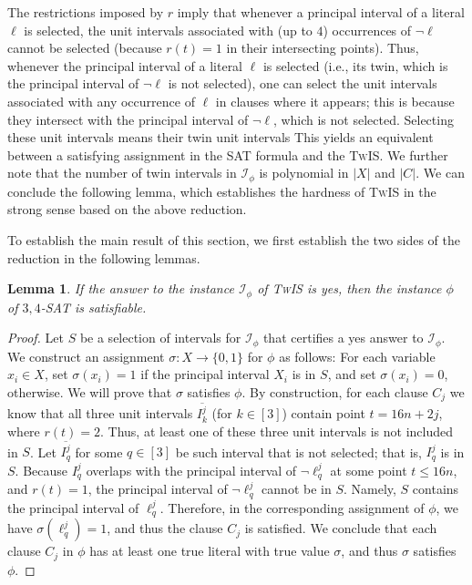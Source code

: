 \documentclass[letterpaper,11pt]{article}
\newtheorem{lemma}[theorem]{Lemma}
\newcommand{\sat}{\textsc{SAT}\xspace}
\newcommand{\sssattt}{\textsc{$3,4$-SAT}\xspace}
\newcommand{\tis}{\textsc{TwIS}\xspace}
\begin{document}
The restrictions imposed by $r$ imply that whenever a principal interval of a literal $\ell$ is selected, the unit intervals associated with (up to $4$) occurrences of $\neg \ell$ 
cannot be selected (because $r(t) = 1$ in their intersecting points). Thus, whenever the principal interval of a literal $\ell$ is selected (i.e., its twin, which is the principal interval of $\neg \ell$ is not selected), one can select the unit intervals associated with any occurrence of $\ell$ in clauses where it appears; this is because they intersect with the principal interval of $\neg \ell$, which is not selected. Selecting these unit intervals means their twin unit intervals
This yields an equivalent between a satisfying assignment in the \sat formula and the \tis. 
We further note that the number of twin intervals in $\mathcal{I}_\phi$ is polynomial in $|X|$ and $|C|$. We can conclude the following lemma, which establishes the hardness of \tis in the strong sense based on the above reduction.

To establish the main result of this section,
we first establish the two sides of the reduction in the following lemmas. 

\begin{lemma} \label{lemma2_SATtoTIS}
If the answer to the instance $\mathcal{I}_\phi$ of \tis is yes, then the instance $\phi$ of \sssattt is satisfiable.
\end{lemma}

\begin{proof}
Let $S$ be a selection of intervals for $\mathcal{I}_\phi$ that certifies a yes answer to $\mathcal{I}_\phi$. We construct an assignment $\sigma: X \to \{0, 1\}$ for $\phi$ as follows: For each variable $x_i \in X$, set $\sigma(x_i) = 1$ if the principal interval $X_i$ is in $S$, and set $\sigma(x_i) = 0$, otherwise.
We will prove that $\sigma$ satisfies $\phi$. By construction, for each clause $C_j$ we know that all three unit intervals $\overline{ I^j_k}$ (for $k\in[3]$) contain point $t=16n+2j$, where $r(t)=2$. Thus, at least one of these three unit intervals is not included in $S$. Let $\overline{I^j_q}$ for some $q\in [3]$ be such interval that is not selected; that is, $I^j_q$ is in $S$. Because $I^j_q$ overlaps with the principal interval of $\neg {\ell^j_q}$ at some point $t \leq 16n$, and $r(t)=1$, the principal interval of $\neg {\ell^j_q}$ cannot be in $S$. Namely, $S$ contains the principal interval of $\ell^j_q$. Therefore, in the corresponding assignment of $\phi$, we have $\sigma(\ell^j_q)=1$, and thus the clause $C_j$ is satisfied. We conclude that each clause $C_j$ in $\phi$ has at least one true literal with true value $\sigma$, and thus $\sigma$ satisfies $\phi$.
\end{proof}
\end{document}
